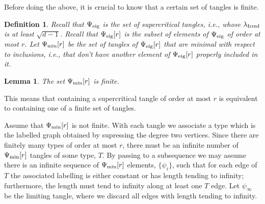 \documentclass[12pt]{article}
\newtheorem{lemma}[theorem]{Lemma}
\newtheorem{definition}[theorem]{Definition}
\newcommand{\tang}{{\psi}}	%
\newcommand{\tset}{{\Psi}}
\newcommand{\tseig}{{\tset_{\rm eig}}}
\newcommand{\tsmin}{{\tset_{\rm min}}}
\newcommand{\E}[1]{\mbox{E}\left[#1\right] }
\newcommand{\proof}{{\par\noindent {\bf Proof}\space\space}}
\newcommand{\ird}[1]{{\rm Irred}_{#1}}
\begin{document}





Before doing the above, 
it is crucial to know that a certain set of tangles
is finite.

\begin{definition}
Recall that $\tseig$ is the set of supercritical tangles, i.e.,
whose $\lambda_{\ird{}}$ is at least
$\sqrt{d-1}$.  Recall that $\tseig[r]$ is the subset of elements of 
$\tseig$ of
order at most $r$.  Let $\tsmin[r]$ be the set of tangles of
$\tseig[r]$ that are minimal with respect to inclusions, i.e., that
don't have another element of $\tseig[r]$ properly included in it.
\end{definition}

\begin{lemma}\label{lm:finiteness}
The set $\tsmin[r]$ is finite.
\end{lemma}
This means that containing a supercritical tangle of order at most $r$
is equivalent to containing
one of a finite set of tangles.
\proof
Assume that $\tsmin[r]$ is not finite.  With each tangle we associate
a type which is the labelled graph obtained by supressing the degree
two vertices.  Since there are finitely many types of order at most $r$,
there must be an infinite number of $\tsmin[r]$ tangles of some type,
$T$.  By passing to a subsequence we may assume there is an infinite
sequence of $\tsmin[r]$ elements, $\{\tang_i\}$, such that for each edge
of $T$ the associated labelling is either constant or has length
tending to infinity; furthermore, the length must tend to infinity 
along at least one $T$ edge.  Let $\tang_\infty$ be the limiting tangle,
where we discard all edges with length tending to infinity.  
\end{document}
